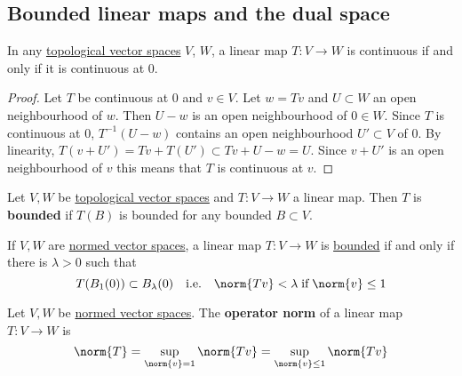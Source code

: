 \documentclass{article}
\begin{document}
\subsection{Bounded linear maps and the dual space}

\begin{fact}
    In any \hyperlink{def:topologicalVectorSpace}{topological vector spaces} $V$, $W$, a linear map $T: V \to W$ is continuous if and only if it is continuous at $0$.
\end{fact}

\begin{proof}
    Let $T$ be continuous at $0$ and $v \in V$. Let $w = Tv$ and $U \subset W$ an open neighbourhood of $w$. Then $U - w$ is an open neighbourhood of $0 \in W$. Since $T$ is continuous at $0$, $T^{-1}(U - w)$ contains an open neighbourhood $U' \subset V$ of $0$.
    By linearity, $T(v + U') = Tv + T(U') \subset Tv + U - w = U$.  Since $v + U'$ is an open neighbourhood of $v$ this means that $T$ is continuous at $v$.
\end{proof}

\begin{defi}
    Let $V, W$ be \hyperlink{def:topologicalVectorSpace}{topological vector spaces} and $T: V \to W$ a linear map. Then $T$ is \textbf{bounded} if $T(B)$ is bounded for any bounded $B \subset V$.
\end{defi}

\begin{fact}
    If $V, W$ are \hyperlink{def:normedVectorSpace}{normed vector spaces}, a linear map $T: V \to W$ is \hyperlink{def:boundedLinearMap}{bounded} if and only if there is $\lambda > 0$ such that
    \begin{equation*}
        T(B_1(0)) \subset B_\lambda(0) \quad \text{i.e.} \quad \norm{Tv} < \lambda \; \text{if} \; \norm{v} \le 1
    \end{equation*}
\end{fact}


\begin{defi}
    Let $V, W$ be \hyperlink{def:normedVectorSpace}{normed vector spaces}. The \textbf{operator norm} of a linear map $T: V \to W$ is
    \begin{equation*}
        \norm{T} = \sup_{\norm{v} = 1} \norm{T v} =\sup_{\norm{v} \leq 1} \norm{T v}
    \end{equation*}
\end{defi}
\end{document}
